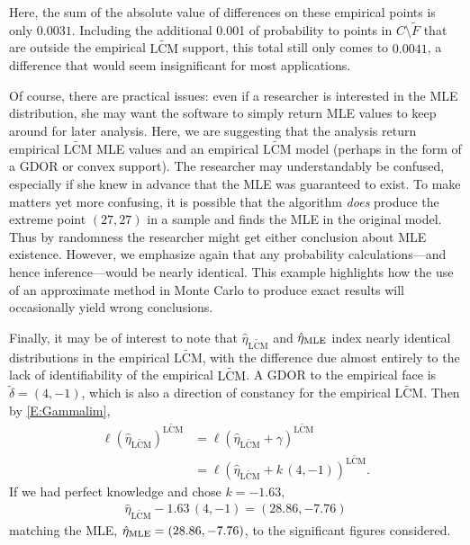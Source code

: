 Here, the sum of the absolute value of differences on these empirical points is only 
$0.0031$.  Including the additional 0.001 of probability to points in $C \setminus \tilde{F}$ 
that are outside 
the empirical $\widetilde{\textrm{LCM}}$ support, this total still only comes to $0.0041$, a 
difference that would seem 
insignificant for most applications.  

Of course, there are practical issues: even if a researcher is interested in the 
MLE distribution, she may want the software to simply 
return MLE values to keep around for later analysis.  Here, we are suggesting that the 
analysis return empirical $\widetilde{\textrm{LCM}}$ MLE values and an 
empirical $\widetilde{\textrm{LCM}}$ model (perhaps in the form of a GDOR or
convex support).  The researcher may understandably be confused, especially if she knew in 
advance that the MLE was guaranteed to exist.  
To make matters yet more confusing, it is possible that the
algorithm \emph{does} produce the extreme point $(27,27)$ in a sample and finds the MLE
in the original model.  Thus by randomness the researcher might get either conclusion
about MLE existence.  
However, we emphasize again that
any probability calculations---and hence inference---would be nearly identical.
This example highlights how the use of an approximate method in Monte Carlo to produce
exact results will occasionally yield wrong conclusions.

Finally, it may be of interest to note that $\hat{\eta}_{\widetilde{\textrm{LCM}}}$ and $\hat{\eta}_{\textrm{MLE}}$ index nearly identical 
distributions in the empirical $\widetilde{\textrm{LCM}}$, with the difference due almost entirely to the lack of 
identifiability of the empirical $\widetilde{\textrm{LCM}}$.  A GDOR to the empirical face is 
$\tilde{\delta} = (4,-1)$, which is also a direction of constancy for the empirical $\widetilde{\textrm{LCM}}$. 
Then by \eqref{E:Gammalim}, 
\begin{align*}
	\ell(\hat{\eta}_{\widetilde{\textrm{LCM}}})^{\widetilde{\textrm{LCM}}} &= 
	\ell( \hat{\eta}_{\widetilde{\textrm{LCM}}} + \gamma )^{\widetilde{\textrm{LCM}}}\\
				 &= 	\ell(\hat{\eta}_{\widetilde{\textrm{LCM}}} + k \, (4,-1))^{\widetilde{\textrm{LCM}}}.
\end{align*}
If we had perfect knowledge and chose $k = -1.63$,
\begin{align*}
	\hat{\eta}_{\widetilde{\textrm{LCM}}}  -1.63 \, (4,-1)= (28.86, -7.76) 
\end{align*}
matching the MLE, $\hat{\eta}_{\textrm{MLE}} = (28.86, -7.76)$, to the significant figures considered.  

